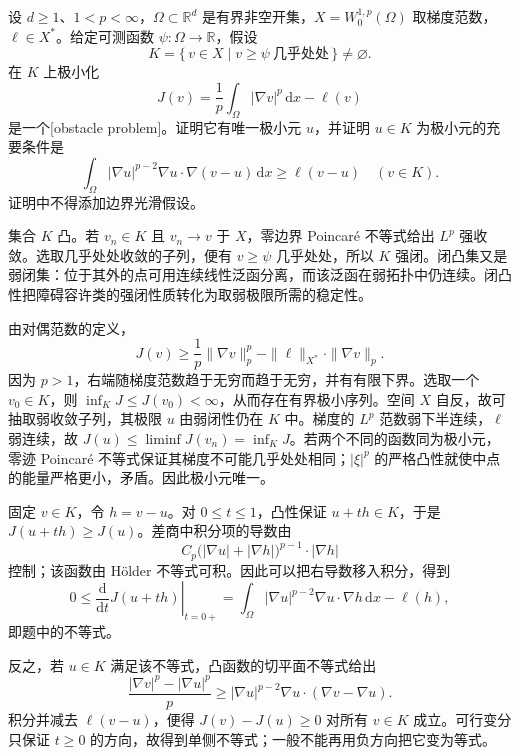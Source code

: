 \begin{exercise}\label{b2:ex:H2-obstacle}
设 \(d\ge1\)、\(1<p<\infty\)，\(\Omega\subset\mathbb R^d\) 是有界非空开集，\(X=W_0^{1,p}(\Omega)\) 取梯度范数，\(\ell\in X^*\)。给定可测函数 \(\psi:\Omega\to\mathbb R\)，假设
\[
 K=\{\,v\in X\mid v\ge\psi\ \text{几乎处处}\,\}\ne\varnothing.
\]
在 \(K\) 上极小化
\[
 J(v)=\frac1p\int_\Omega|\nabla v|^p\,\mathrm dx-\ell(v)
\]
是一个[obstacle problem]。证明它有唯一极小元 \(u\)，并证明 \(u\in K\) 为极小元的充要条件是
\[
 \int_\Omega|\nabla u|^{p-2}\nabla u\cdot\nabla(v-u)\,\mathrm dx
 \ge\ell(v-u)\quad(v\in K).
\]
证明中不得添加边界光滑假设。
\end{exercise}
\begin{solution}
集合 \(K\) 凸。若 \(v_n\in K\) 且 \(v_n\to v\) 于 \(X\)，零边界 Poincaré 不等式给出 \(L^p\) 强收敛。选取几乎处处收敛的子列，便有 \(v\ge\psi\) 几乎处处，所以 \(K\) 强闭。闭凸集又是弱闭集：位于其外的点可用连续线性泛函分离，而该泛函在弱拓扑中仍连续。闭凸性把障碍容许类的强闭性质转化为取弱极限所需的稳定性。

由对偶范数的定义，
\[
 J(v)\ge\frac1p\|\nabla v\|_p^p
           -\|\ell\|_{X^*}\cdot\|\nabla v\|_p.
\]
因为 \(p>1\)，右端随梯度范数趋于无穷而趋于无穷，并有有限下界。选取一个 \(v_0\in K\)，则 \(\inf_KJ\le J(v_0)<\infty\)，从而存在有界极小序列。空间 \(X\) 自反，故可抽取弱收敛子列，其极限 \(u\) 由弱闭性仍在 \(K\) 中。梯度的 \(L^p\) 范数弱下半连续，\(\ell\) 弱连续，故 \(J(u)\le\liminf J(v_n)=\inf_KJ\)。若两个不同的函数同为极小元，零迹 Poincaré 不等式保证其梯度不可能几乎处处相同；\(|\xi|^p\) 的严格凸性就使中点的能量严格更小，矛盾。因此极小元唯一。

固定 \(v\in K\)，令 \(h=v-u\)。对 \(0\le t\le1\)，凸性保证 \(u+th\in K\)，于是 \(J(u+th)\ge J(u)\)。差商中积分项的导数由
\[
 C_p\bigl(|\nabla u|+|\nabla h|\bigr)^{p-1}\cdot|\nabla h|
\]
控制；该函数由 Hölder 不等式可积。因此可以把右导数移入积分，得到
\[
 0\le\left.\frac{\mathrm d}{\mathrm dt}J(u+th)\right|_{t=0+}
 =\int_\Omega|\nabla u|^{p-2}\nabla u\cdot\nabla h\,\mathrm dx-\ell(h),
\]
即题中的不等式。

反之，若 \(u\in K\) 满足该不等式，凸函数的切平面不等式给出
\[
 \frac{|\nabla v|^p-|\nabla u|^p}{p}
 \ge |\nabla u|^{p-2}\nabla u\cdot(\nabla v-\nabla u).
\]
积分并减去 \(\ell(v-u)\)，便得 \(J(v)-J(u)\ge0\) 对所有 \(v\in K\) 成立。可行变分只保证 \(t\ge0\) 的方向，故得到单侧不等式；一般不能再用负方向把它变为等式。
\end{solution}

